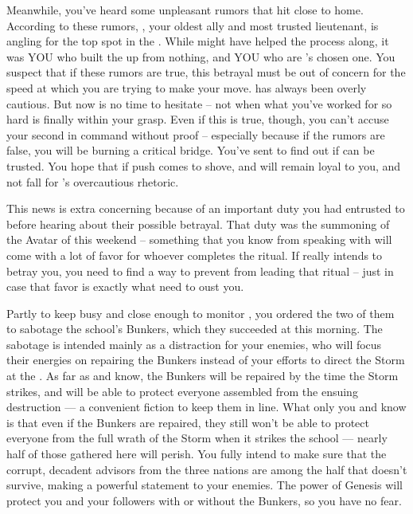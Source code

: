 \documentclass[char]{GL2020}
\begin{document}
Meanwhile, you've heard some unpleasant rumors that hit close to home. According to these rumors, \cChupSecond{}, your oldest ally and most trusted lieutenant, is angling for the top spot in the \pGoaties{}. While \cChupSecond{} might have helped the process along, it was YOU who built the \pGoaties{} up from nothing, and YOU who are \cGenesis{}'s chosen one. You suspect that if these rumors are true, this betrayal must be out of concern for the speed at which you are trying to make your move. \cChupSecond{} has always been overly cautious. But now is no time to hesitate -- not when what you've worked for so hard is finally within your grasp. Even if this is true, though, you can't accuse your second in command without proof -- especially because if the rumors are false, you will be burning a critical bridge. You've sent \cChupStudent{} to find out if \cChupSecond{} can be trusted. You hope that if push comes to shove, \cChupStudent{} and \cChupInventor{} will remain loyal to you, and not fall for \cChupSecond{}'s overcautious rhetoric. 

This news is extra concerning because of an important duty you had entrusted to \cChupSecond{} before hearing about their possible betrayal. That duty was the summoning of the Avatar of \cGenesis{} this weekend -- something that you know from speaking with \cGenesis{} will come with a lot of favor for whoever completes the ritual. If \cChupSecond{} really intends to betray you, you need to find a way to prevent \cChupSecond{\them} from leading that ritual -- just in case that favor is exactly what \cChupSecond{\they} need\cChupSecond{\plural} to oust you. 

Partly to keep \cChupSecond{} busy and \cChupStudent{} close enough to monitor \cChupSecond{\them}, you ordered the two of them to sabotage the school's Bunkers, which they succeeded at this morning. The sabotage is intended mainly as a distraction for your enemies, who will focus their energies on repairing the Bunkers instead of your efforts to direct the Storm at the \pSc{}. As far as \cChupStudent{} and \cChupInventor{} know, the Bunkers will be repaired by the time the Storm strikes, and will be able to protect everyone assembled from the ensuing destruction — a convenient fiction to keep them in line. What only you and \cChupSecond{} know is that even if the Bunkers are repaired, they still won't be able to protect everyone from the full wrath of the Storm when it strikes the school — nearly half of those gathered here will perish. You fully intend to make sure that the corrupt, decadent advisors from the three nations are among the half that doesn't survive, making a powerful statement to your enemies. The power of Genesis will protect you and your followers with or without the Bunkers, so you have no fear.
\end{document}
